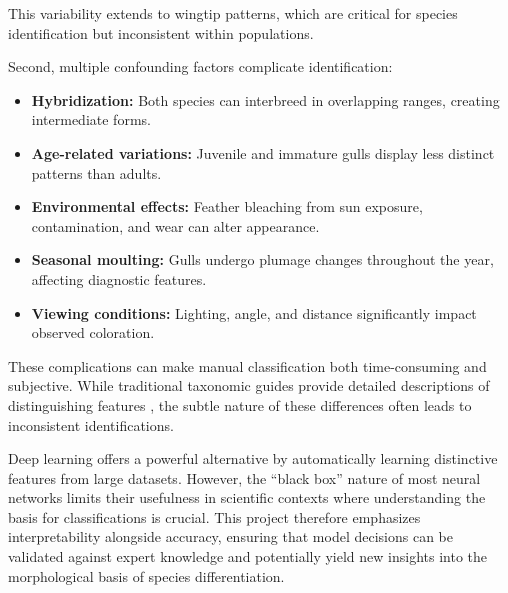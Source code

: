 This variability extends to wingtip patterns, which are critical for species identification but inconsistent within populations.

Second, multiple confounding factors complicate identification:
\begin{itemize}
    \item \textbf{Hybridization:} Both species can interbreed in overlapping ranges, creating intermediate forms.
    \item \textbf{Age-related variations:} Juvenile and immature gulls display less distinct patterns than adults.
    \item \textbf{Environmental effects:} Feather bleaching from sun exposure, contamination, and wear can alter appearance.
    \item \textbf{Seasonal moulting:} Gulls undergo plumage changes throughout the year, affecting diagnostic features.
    \item \textbf{Viewing conditions:} Lighting, angle, and distance significantly impact observed coloration.
\end{itemize}

These complications can make manual classification both time-consuming and subjective. While traditional taxonomic guides provide detailed descriptions of distinguishing features \cite{taxonomicguide2023}, the subtle nature of these differences often leads to inconsistent identifications.

Deep learning offers a powerful alternative by automatically learning distinctive features from large datasets. However, the ``black box'' nature of most neural networks limits their usefulness in scientific contexts where understanding the basis for classifications is crucial. This project therefore emphasizes interpretability alongside accuracy, ensuring that model decisions can be validated against expert knowledge and potentially yield new insights into the morphological basis of species differentiation.

